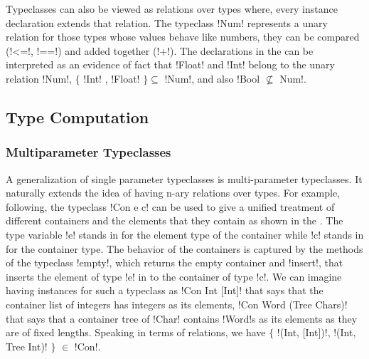 \documentclass[screen,nonacm]{acmart}
\begin{document}
Typeclasses can also be viewed as relations over types\cite{morris_simple_2014}
where, every instance declaration extends that relation. The typeclass !Num!
represents a unary relation for those types whose values behave like
numbers, they can be compared (!<=!, !==!) and added together (!+!).
The declarations in the  can be interpreted as an
evidence of fact that !Float! and !Int! belong to the unary relation
!Num!, $\{$ !Int! , !Float! $\} \subseteq$ !Num!, and also !Bool $\not\subseteq$ Num!.

\subsection{Type Computation}\label{sec:type-computation}
\subsubsection{Multiparameter Typeclasses}\label{sec:multiparam-typeclasses}
A generalization of single parameter typeclasses is multi-parameter
typeclasses. It naturally extends the idea of having n-ary relations
over types. For example, following\cite{jones_tcfd_2000}, the
typeclass !Con e c! can be used to give a unified treatment of
different containers and the elements that they contain as shown in
the . The type variable !e! stands in for the
element type of the container while !c! stands in for the container
type. The behavior of the containers is captured by the methods of the
typeclass !empty!, which returns the empty container and !insert!,
that inserts the element of type !e! in to the container of type !c!.
We can imagine having instances for such a typeclass as
!Con Int [Int]! that says that the container list of integers has
integers as its elements, !Con Word (Tree Chars)! that says that a
container tree of !Char! contains !Word!s as its
elements as they are of fixed lengths. Speaking in terms of
relations, we have $\{$ !(Int, [Int])!, !(Int, Tree Int)! $\}$ $\in$ !Con!.
\end{document}
